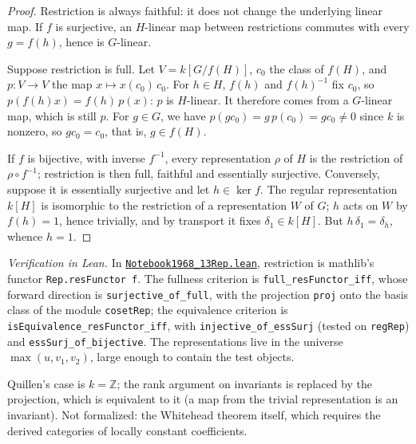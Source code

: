 \begin{proof}
Restriction is always faithful: it does not change the underlying linear map. If $f$ is surjective, an $H$-linear map between restrictions commutes with every $g = f(h)$, hence is $G$-linear.

Suppose restriction is full. Let $V = k[G/f(H)]$, $c_0$ the class of $f(H)$, and $p : V \to V$ the map $x \mapsto x(c_0)\,c_0$. For $h \in H$, $f(h)$ and $f(h)^{-1}$ fix $c_0$, so $p(f(h)x) = f(h)\,p(x)$: $p$ is $H$-linear. It therefore comes from a $G$-linear map, which is still $p$. For $g \in G$, we have $p(g c_0) = g\,p(c_0) = g c_0 \neq 0$ since $k$ is nonzero, so $g c_0 = c_0$, that is, $g \in f(H)$.

If $f$ is bijective, with inverse $f^{-1}$, every representation $\rho$ of $H$ is the restriction of $\rho \circ f^{-1}$; restriction is then full, faithful and essentially surjective. Conversely, suppose it is essentially surjective and let $h \in \ker f$. The regular representation $k[H]$ is isomorphic to the restriction of a representation $W$ of $G$; $h$ acts on $W$ by $f(h) = 1$, hence trivially, and by transport it fixes $\delta_1 \in k[H]$. But $h\,\delta_1 = \delta_h$, whence $h = 1$.
\end{proof}

\begin{sloppypar}
\noindent\emph{Verification in Lean.} In \href{\leanblobmain/Notebook1968_13Rep.lean}{\texttt{Notebook1968\_13Rep.\allowbreak{}lean}}, restriction is mathlib's functor \texttt{Rep.resFunctor f}. The fullness criterion is \texttt{full\_resFunctor\_iff}, whose forward direction is \texttt{surjective\_of\_full}, with the projection \texttt{proj} onto the basis class of the module \texttt{cosetRep}; the equivalence criterion is \texttt{isEquivalence\_resFunctor\_iff}, with \texttt{injective\_of\_essSurj} (tested on \texttt{regRep}) and \texttt{essSurj\_of\_bijective}. The representations live in the universe $\max(u, v_1, v_2)$, large enough to contain the test objects.
\end{sloppypar}

Quillen's case is $k = \mathbb{Z}$; the rank argument on invariants is replaced by the projection, which is equivalent to it (a map from the trivial representation is an invariant). Not formalized: the Whitehead theorem itself, which requires the derived categories of locally constant coefficients.

